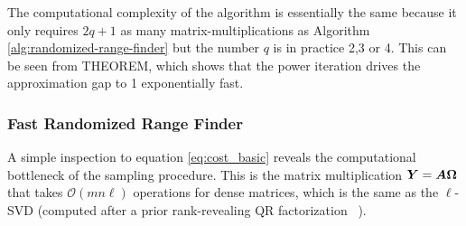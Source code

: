 \begin{figure}[ht]
\begin{center}
\end{center}
\end{figure}

The computational complexity of the algorithm is essentially the same because
it only requires $2q+1$ as many matrix-multiplications as Algorithm
\ref{alg:randomized-range-finder}
but the number $q$ is in practice 2,3 or 4. This can be seen from 
THEOREM, which shows that the power iteration drives the approximation
gap to 1 exponentially fast.



\subsubsection{Fast Randomized Range Finder}
\label{alg:fast-randomized-range-finder}

A simple inspection to equation \ref{eq:cost_basic} reveals the computational
bottleneck of the sampling procedure. This is the matrix multiplication
$\bm{Y}=\bm{A}\bm{\Omega}$ that takes $\mathcal{O}(mn\ell)$ operations
for dense matrices, which is the same as the $\ell$-SVD (computed
after a prior rank-revealing QR factorization
~\cite{gu1996efficient}).

